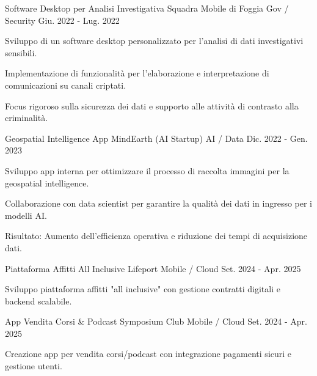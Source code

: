 
\vspace{0.3cm}

\begin{cventries}

  \cventry
  {Software Desktop per Analisi Investigativa}
  {Squadra Mobile di Foggia}
  {Gov / Security}
  {Giu. 2022 - Lug. 2022}
  {
    \begin{cvitems}
      \item {Sviluppo di un software desktop personalizzato per l'analisi di dati investigativi sensibili.}
      \item {Implementazione di funzionalità per l'elaborazione e interpretazione di comunicazioni su canali criptati.}
      \item {Focus rigoroso sulla sicurezza dei dati e supporto alle attività di contrasto alla criminalità.}
    \end{cvitems}
  }

  \vspace{0.8cm}

  \cventry
  {Geospatial Intelligence App}
  {MindEarth (AI Startup)}
  {AI / Data}
  {Dic. 2022 - Gen. 2023}
  {
    \begin{cvitems}
      \item {Sviluppo app interna per ottimizzare il processo di raccolta immagini per la geospatial intelligence.}
      \item {Collaborazione con data scientist per garantire la qualità dei dati in ingresso per i modelli AI.}
      \item {Risultato: Aumento dell'efficienza operativa e riduzione dei tempi di acquisizione dati.}
    \end{cvitems}
  }

  \vspace{0.8cm}

  \cventry
  {Piattaforma Affitti All Inclusive}
  {Lifeport}
  {Mobile / Cloud}
  {Set. 2024 - Apr. 2025}
  {
    \begin{cvitems}
      \item {Sviluppo piattaforma affitti "all inclusive" con gestione contratti digitali e backend scalabile.}
    \end{cvitems}
  }

  \vspace{0.8cm}

  \cventry
  {App Vendita Corsi \& Podcast}
  {Symposium Club}
  {Mobile / Cloud}
  {Set. 2024 - Apr. 2025}
  {
    \begin{cvitems}
      \item {Creazione app per vendita corsi/podcast con integrazione pagamenti sicuri e gestione utenti.}
    \end{cvitems}
  }


\end{cventries}
